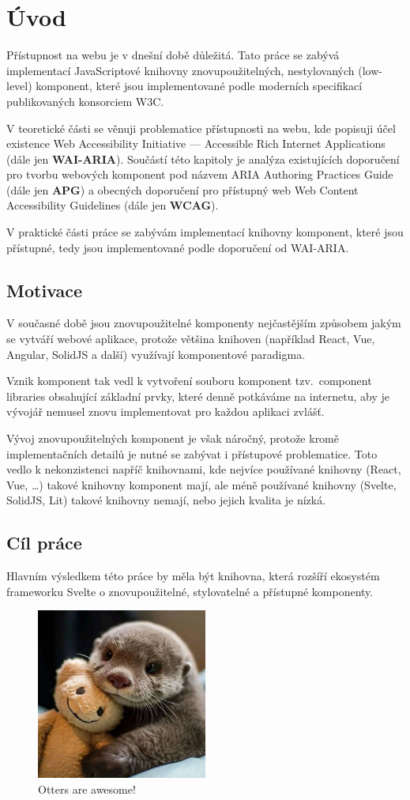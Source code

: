 \chapter{Úvod}

Přístupnost na webu je v dnešní době důležitá. Tato práce se zabývá implementací JavaScriptové knihovny
znovupoužitelných, nestylovaných (low-level) komponent, které jsou implementované podle moderních specifikací publikovaných konsorciem W3C.

V teoretické části se věnuji problematice přístupnosti na webu, kde popisuji účel existence
Web Accessibility Initiative --- Accessible Rich Internet Applications (dále jen \textbf{WAI-ARIA}).
Součástí této kapitoly je analýza existujících doporučení pro tvorbu webových
komponent pod názvem ARIA Authoring Practices Guide (dále jen \textbf{APG}) a
obecných doporučení pro přístupný web Web Content Accessibility Guidelines (dále jen \textbf{WCAG}).

V praktické části práce se zabývám implementací knihovny komponent,
které jsou přístupné, tedy jsou implementované podle doporučení od WAI-ARIA.

\section{Motivace}

V současné době jsou znovupoužitelné komponenty nejčastějším způsobem jakým se vytváří webové aplikace, protože většina knihoven (například React, Vue, Angular, SolidJS a další) využívají komponentové paradigma.

Vznik komponent tak vedl k vytvoření souboru komponent tzv.\ component libraries obsahující základní prvky, které denně potkáváme na internetu, aby je vývojář nemusel znovu implementovat pro každou aplikaci zvlášť.

Vývoj znovupoužitelných komponent je však náročný, protože kromě implementačních detailů je nutné se zabývat i přístupové problematice. Toto vedlo k nekonzistenci napříč knihovnami, kde nejvíce používané knihovny (React, Vue, \dots) takové knihovny komponent mají, ale méně používané knihovny (Svelte, SolidJS, Lit) takové knihovny nemají, nebo jejich kvalita je nízká.

\section{Cíl práce}


Hlavním výsledkem této práce by měla být knihovna, která rozšíří ekosystém frameworku Svelte o znovupoužitelné, stylovatelné a přístupné komponenty.


\begin{figure}
    \centering
    \includegraphics[width=0.5\textwidth]{./assets/figures/chapter-1/otter.jpg}
    \caption{Otters are awesome!}
\end{figure}
